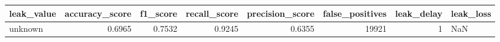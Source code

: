 \begin{tabular}{lrrrrrrl}
\toprule
leak\_value & accuracy\_score & f1\_score & recall\_score & precision\_score & false\_positives & leak\_delay & leak\_loss \\
\midrule
unknown & 0.6965 & 0.7532 & 0.9245 & 0.6355 & 19921 & 1 & NaN \\
\bottomrule
\end{tabular}
